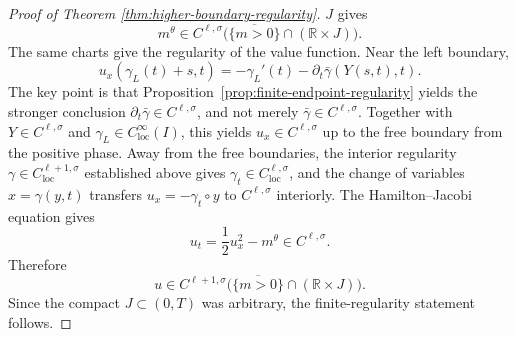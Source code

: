 \documentclass[11pt]{amsart}
\newcommand{\R}{\mathbb R}
\newcommand{\loc}{\mathrm{loc}}
\begin{document}
\begin{proof}[Proof of Theorem \ref{thm:higher-boundary-regularity}]
\(J\) gives
\[
        m^\theta\in
        C^{\ell,\sigma}\bigl(\overline{\{m>0\}}\cap(\R\times J)\bigr).
\]
The same charts give the regularity of the value function. Near the left
boundary,
\[
        u_x(\gamma_L(t)+s,t)
        =
        -\gamma_L'(t)-\partial_t\bar{\gamma}(Y(s,t),t).
\]
The key point is that Proposition~\ref{prop:finite-endpoint-regularity}
yields the stronger conclusion \(\partial_t\bar{\gamma}\in C^{\ell,\sigma}\),
and not merely \(\bar{\gamma}\in C^{\ell,\sigma}\). Together with
\(Y\in C^{\ell,\sigma}\) and \(\gamma_L\in C^\infty_{\loc}(I)\), this yields
\(u_x\in C^{\ell,\sigma}\) up to the free boundary from the positive phase. Away from
the free boundaries, the interior regularity
\(\gamma\in C^{\ell+1,\sigma}_{\loc}\) established above gives
\(\gamma_t\in C^{\ell,\sigma}_{\loc}\), and the change of variables
\(x=\gamma(y,t)\) transfers \(u_x=-\gamma_t\circ y\) to \(C^{\ell,\sigma}\)
interiorly. The
Hamilton--Jacobi equation gives
\[
        u_t=\frac12u_x^2-m^\theta\in C^{\ell,\sigma}.
\]
Therefore
\[
        u\in
        C^{\ell+1,\sigma}\bigl(\overline{\{m>0\}}\cap(\R\times J)\bigr).
\]
Since the compact \(J\subset(0,T)\) was arbitrary, the finite-regularity
statement follows.
\end{proof}
\end{document}
